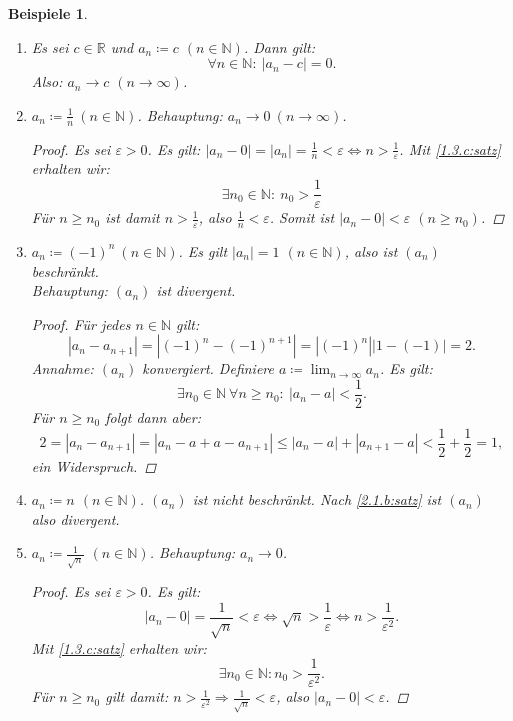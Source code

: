 \documentclass[12pt]{extreport} %
\newcommand{\N}{\mathbb{N}}
\newcommand{\R}{\mathbb{R}}
\theoremstyle{named}
\theoremstyle{itshape}
\theoremstyle{normal}
\newtheorem*{beispiele}{Beispiele}
\begin{document}
\begin{beispiele}\
	\begin{enumerate}
		\item Es sei $c \in \R$ und $a_{n} \coloneqq c$ $(n \in \N)$. Dann gilt:
			$$
				\forall n \in \N: ~ | a_{n} - c | = 0.
			$$
			Also: $a_{n} \rightarrow c$ $(n \to \infty)$.
		\item $a_{n} \coloneqq \frac{1}{n} ~(n \in \N)$. Behauptung: $a_{n} \rightarrow 0 ~(n \rightarrow \infty)$.
			\begin{proof}
				Es sei $\varepsilon > 0$. Es gilt: $|a_{n} - 0 | = |a_{n}| = \frac{1}{n} < \varepsilon \iff n > \frac{1}{\varepsilon}$. Mit
				\ref{1.3.c:satz} erhalten wir:
				$$
						\exists n_{0} \in \N: ~ n_{0} > \frac{1}{\varepsilon}
				$$
				Für $n \geq n_{0}$ ist damit $n > \frac{1}{\varepsilon}$, also $\frac{1}{n} < \varepsilon$. Somit ist
				$|a_{n} - 0| < \varepsilon$ $(n \geq n_{0})$.
			\end{proof}
		\item $a_{n} \coloneqq (-1)^{n} ~(n \in \N)$. Es gilt $|a_{n}| = 1$ $(n \in \N)$, also ist $(a_{n})$ beschränkt. \\
		      Behauptung: $(a_{n})$ ist divergent.
			\begin{proof}
				Für jedes $n \in \N$ gilt: 
				$$ |a_{n} - a_{n+1}| = |(-1)^{n} - (-1)^{n+1}| = |(-1)^{n}|| 1 - (-1) | = 2. $$
				Annahme: $(a_{n})$ konvergiert. Definiere $a \coloneqq \lim_{n \to \infty} a_{n}$. Es gilt:
				$$
					 \exists n_{0} \in \N ~ \forall n \geq n_{0}: ~ |a_{n} - a| < \frac{1}{2}. 
				$$
				Für $n \geq n_{0}$ folgt dann aber:
				$$
					2 = |a_{n} - a_{n+1}| = |a_{n} - a + a - a_{n + 1}| \leq |a_{n} - a| + |a_{n+1} - a| < \frac{1}{2} + \frac{1}{2} = 1,
				$$
				ein Widerspruch.
			\end{proof}
		\item $a_{n} \coloneqq n$ $(n \in \N)$. $(a_{n})$ ist nicht beschränkt. Nach \ref{2.1.b:satz} ist $(a_{n})$ also divergent.
		\item $a_{n} \coloneqq  \frac{1}{\sqrt{n}}$ $(n \in \N)$. Behauptung: $a_{n} \rightarrow 0$.
			\begin{proof}
				Es sei $\varepsilon > 0$. Es gilt:
				$$
					|a_{n} - 0| = \frac{1}{\sqrt{n}} < \varepsilon \iff \sqrt{n} > \frac{1}{\varepsilon} \iff n > \frac{1}{\varepsilon^{2}}.
				$$
				Mit {\ref{1.3.c:satz}} erhalten wir: $$\exists n_{0} \in \N: n_{0} > \frac{1}{\varepsilon^{2}}.$$
				Für $n \geq n_{0}$ gilt damit: $n > \frac{1}{\varepsilon^{2}} \Rightarrow \frac{1}{\sqrt{n}} < \varepsilon$, also $|a_{n} - 0 | < \varepsilon$. 

\end{proof}
\end{enumerate}
\end{beispiele}
\end{document}
